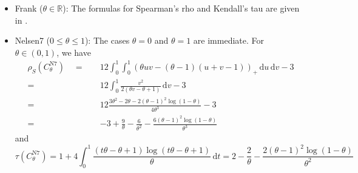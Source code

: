 \documentclass{article}
\def\of#1{\left(#1\right)} %
\def\inbrackets#1{\of{#1}} %
\newcommand{\de}{\mathrm{\,d}}
\newcommand{\R}{\mathbb{R}}
\begin{document}
\begin{itemize}
\[    ,\]
    from which we get for $\theta\neq 0$
    \begin{align*}
        \xi\of{C^{\text{AMH}}_{\theta}}
        \quad = \quad & 6 \int_0^1\int_0^1 \inbrackets{\frac{v \left(\theta u \left(v - 1\right) - \theta \left(u - 1\right) \left(v - 1\right) + 1\right)}{\left(\theta \left(u - 1\right) \left(v - 1\right) - 1\right)^{2}}}^2 \de u \de v - 2 \\
        \quad = \quad & 6 \int_0^1 \frac{v^{2} \left(\frac{\theta^{2} v^{2}}{3} - \frac{2 \theta^{2} v}{3} + \frac{\theta^{2}}{3} + \theta v - \theta + 1\right)}{\theta v - \theta + 1}
        \de v - 2\\
        \quad = \quad & 6\left(\frac{\theta^{3} \left(8 - \theta\right) + 18 \theta^{2} - 12 \theta - 12 \left(\theta - 1\right)^{2} \log{\left(1 - \theta \right)}}{36 \theta^{3}}
        \right) - 2 \\
        = \quad & - \frac{\theta}{6} - \frac{2}{3} + \frac{3}{\theta} - \frac{2}{\theta^{2}} - \frac{2 \left(\theta - 1\right)^{2} \log{\left(1 - \theta \right)}}{\theta^{3}}
    .\end{align*}
    As $\theta\rightarrow 0$, the computed formula converges to $\xi\of{C^{\text{AMH}}_{0}} = 0$.
    \item Frank ($\theta\in\R$): The formulas for Spearman's rho and Kendall's tau are given in \cite[Exercise 5.9]{Nelsen-2006}.
    \item Nelsen7 ($0\leq\theta\leq 1$): The cases $\theta=0$ and $\theta=1$ are immediate.
    For $\theta\in(0, 1)$, we have
    \begin{align*}
        \rho_S\of{C^{\text{N7}}_{\theta}}
        \quad = \quad & 12 \int_0^1\int_0^1 \left(\theta u v - \left(\theta - 1\right) \left(u + v - 1\right)\right)_+ \de u \de v - 3 \\
        = \quad & 12 \int_0^1 \frac{v^{2}}{2 \left(\theta v - \theta + 1\right)} \de v - 3 \\
        = \quad & 12 \frac{3 \theta^{2} - 2 \theta - 2 \left(\theta - 1\right)^{2} \log{\left(1 - \theta \right)}}{4 \theta^{3}} - 3 \\
        = \quad & -3 + \frac{9}{\theta} - \frac{6}{\theta^{2}} - \frac{6 \left(\theta - 1\right)^{2} \log{\left(1 - \theta \right)}}{\theta^{3}}
    \end{align*}
    and
    \[
        \tau\of{C^{\text{N7}}_{\theta}}
        = 1 + 4\int_0^1 \frac{\left(t \theta - \theta + 1\right) \log{\left(t \theta - \theta + 1 \right)}}{\theta} \de t
        = 2 - \frac{2}{\theta} - \frac{2 \left(\theta - 1\right)^{2} \log{\left(1 - \theta \right)}}{\theta^{2}}
\]
\end{itemize}
\end{document}
